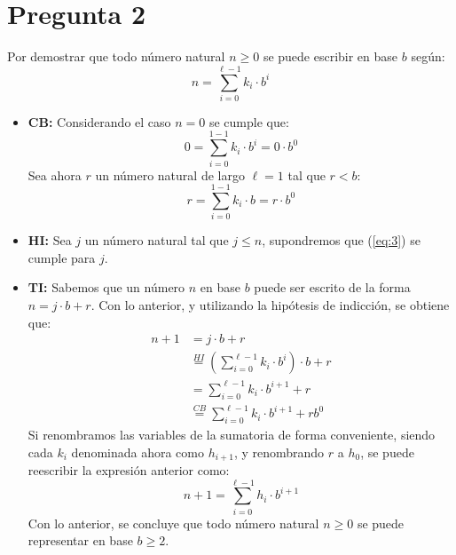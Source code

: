 \documentclass[12pt]{article}
\begin{document}
\section*{Pregunta 2}
Por demostrar que todo número natural $n \geq 0$ se puede escribir en base $b$ según:
\begin{equation}
    \label{eq:3}
    n = \sum_{i=0}^{\ell-1} k_i \cdot b^i
\end{equation}
\begin{itemize}
    \item \textbf{CB:}
    Considerando el caso $n = 0$ se cumple que:
    \begin{equation*}
        0 = \sum_{i=0}^{1-1} k_i \cdot b^i = 0 \cdot b^0
    \end{equation*}
    Sea ahora $r$ un número natural de largo $\ell = 1$ tal que $r < b$:
    \begin{equation*}
        r = \sum_{i=0}^{1-1} k_i \cdot b = r \cdot b^0
    \end{equation*}

    \item \textbf{HI:}
    Sea $j$ un número natural tal que $j \leq n$, supondremos que (\ref*{eq:3}) se cumple
    para $j$.

    \item \textbf{TI:}
    Sabemos que un número $n$ en base $b$ puede ser escrito de la forma
    $n = j \cdot b + r$. Con lo anterior, y utilizando la hipótesis de indicción, se obtiene que:
    \begin{align*}
        n+1 &= j \cdot b + r \\
        &\stackrel{HI}{=} (\sum_{i=0}^{\ell-1} k_i \cdot b^i) \cdot b + r \\
        &= \sum_{i=0}^{\ell-1} k_i \cdot b^{i+1} + r \\
        &\stackrel{CB}{=} \sum_{i=0}^{\ell-1} k_i \cdot b^{i+1} + rb^0
    \end{align*}
    Si renombramos las variables de la sumatoria de forma conveniente, siendo cada $k_i$ denominada ahora
    como $h_{i+1}$, y renombrando $r$ a $h_0$, se puede reescribir la expresión anterior como:
    \begin{equation*}
        n + 1 = \sum_{i=0}^{\ell-1} h_i \cdot b^{i+1}
    \end{equation*}
    Con lo anterior, se concluye que todo número natural $n \geq 0$ se puede representar
    en base $b \geq 2$.
\end{itemize}

\end{document}
